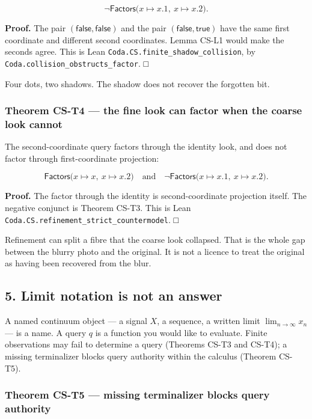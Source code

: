 \documentclass[
  11pt,
]{article}
\begin{document}
\[
\neg\mathsf{Factors}\bigl(x\mapsto x.1,\ x\mapsto x.2\bigr).
\]

\textbf{Proof.} The pair \((\mathsf{false},\mathsf{false})\) and the pair \((\mathsf{false},\mathsf{true})\) have the same first coordinate and different second coordinates. Lemma CS-L1 would make the seconds agree. This is Lean \nolinkurl{Coda.CS.finite_shadow_collision}, by \nolinkurl{Coda.collision_obstructs_factor}. □

Four dots, two shadows. The shadow does not recover the forgotten bit.

\subsubsection{Theorem CS-T4 --- the fine look can factor when the coarse look cannot}\label{theorem-cs-t4-the-fine-look-can-factor-when-the-coarse-look-cannot}

The second-coordinate query factors through the identity look, and does not factor through first-coordinate projection:

\[
\mathsf{Factors}\bigl(x\mapsto x,\ x\mapsto x.2\bigr)
\quad\text{and}\quad
\neg\mathsf{Factors}\bigl(x\mapsto x.1,\ x\mapsto x.2\bigr).
\]

\textbf{Proof.} The factor through the identity is second-coordinate projection itself. The negative conjunct is Theorem CS-T3. This is Lean \nolinkurl{Coda.CS.refinement_strict_countermodel}. □

Refinement can split a fibre that the coarse look collapsed. That is the whole gap between the blurry photo and the original. It is not a licence to treat the original as having been recovered from the blur.

\subsection{5. Limit notation is not an answer}\label{limit-notation-is-not-an-answer}

A named continuum object --- a signal \(X\), a sequence, a written limit \(\lim_{n\to\infty}x_n\) --- is a name. A query \(q\) is a function you would like to evaluate. Finite observations may fail to determine a query (Theorems CS-T3 and CS-T4); a missing terminalizer blocks query authority within the calculus (Theorem CS-T5).

\subsubsection{Theorem CS-T5 --- missing terminalizer blocks query authority}\label{theorem-cs-t5-missing-terminalizer-blocks-query-authority}
\end{document}
